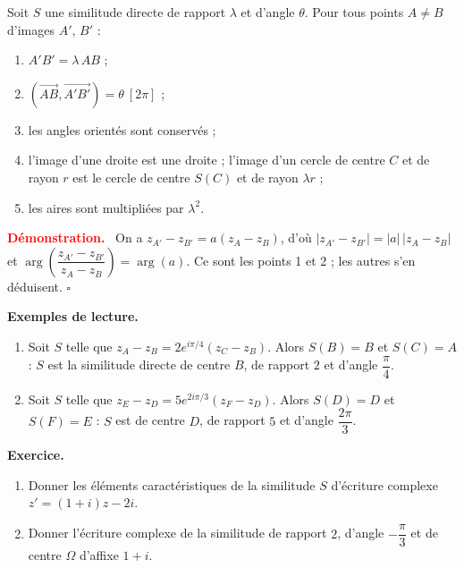 \documentclass[12pt,a4paper]{article}
\newcommand{\arge}{\operatorname{arg}}
\newenvironment{demo}
  {\par\smallskip\noindent\textbf{\textcolor{red}{Démonstration.}}\ }
  {\hfill$\square$\par\smallskip}
\begin{document}
\begin{prop}
Soit $S$ une similitude directe de rapport $\lambda$ et d'angle $\theta$. Pour tous points $A\neq B$ d'images $A'$, $B'$ :
\begin{enumerate}
  \item $A'B'=\lambda\,AB$ ;
  \item $(\overrightarrow{AB},\overrightarrow{A'B'})=\theta\ [2\pi]$ ;
  \item les angles orientés sont conservés ;
  \item l'image d'une droite est une droite ; l'image d'un cercle de centre $C$ et de rayon $r$ est le cercle de centre $S(C)$ et de rayon $\lambda r$ ;
  \item les aires sont multipliées par $\lambda^{2}$.
\end{enumerate}
\end{prop}

\begin{demo}
On a $z_{A'}-z_{B'}=a(z_A-z_B)$, d'où $|z_{A'}-z_{B'}|=|a|\,|z_A-z_B|$ et
$\arge\!\left(\dfrac{z_{A'}-z_{B'}}{z_A-z_B}\right)=\arge(a)$. Ce sont les points 1 et 2 ; les autres s'en déduisent.
\end{demo}

\begin{exo}
\textbf{Exemples de lecture.}
\begin{enumerate}
  \item Soit $S$ telle que $z_A-z_B=2e^{i\pi/4}(z_C-z_B)$. Alors $S(B)=B$ et $S(C)=A$ : $S$ est la similitude directe de centre $B$, de rapport $2$ et d'angle $\dfrac{\pi}{4}$.
  \item Soit $S$ telle que $z_E-z_D=5e^{2i\pi/3}(z_F-z_D)$. Alors $S(D)=D$ et $S(F)=E$ : $S$ est de centre $D$, de rapport $5$ et d'angle $\dfrac{2\pi}{3}$.
\end{enumerate}
\textbf{Exercice.}
\begin{enumerate}
  \item Donner les éléments caractéristiques de la similitude $S$ d'écriture complexe $z'=(1+i)z-2i$.
  \item Donner l'écriture complexe de la similitude de rapport $2$, d'angle $-\dfrac{\pi}{3}$ et de centre $\Omega$ d'affixe $1+i$.
\end{enumerate}
\end{exo}
\end{document}
